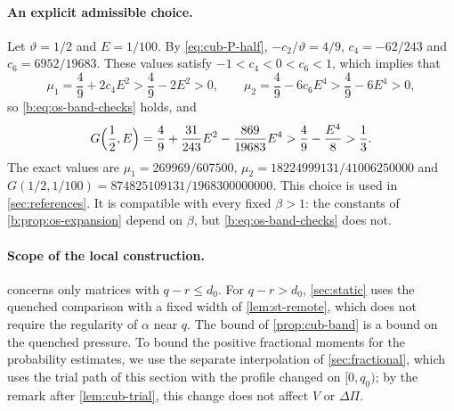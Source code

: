 \paragraph{An explicit admissible choice.} Let $\vartheta=1/2$ and $E=1/100$.
By \eqref{eq:cub-P-half}, $-c_2/\vartheta=4/9$,
$c_4=-62/243$ and $c_6=6952/19683$. These values satisfy $-1<c_4<0<c_6<1$,
which implies that
\[
 \mu_1=\frac49+2c_4E^2>\frac49-2E^2>0,\qquad
 \mu_2=\frac49-6c_6E^4>\frac49-6E^4>0,
\]
so \eqref{b:eq:os-band-checks} holds, and
\[
 G\Bigl(\frac12,E\Bigr)=\frac49+\frac{31}{243}E^2-\frac{869}{19683}E^4
 >\frac49-\frac{E^4}8>\frac13.
\]
The exact values are $\mu_1=269969/607500$, $\mu_2=18224999131/41006250000$ and
$G(1/2,1/100)=874825109131/1968300000000$. This choice is used in
\cref{sec:references}. It is compatible with every fixed $\beta>1$: the
constants of \cref{b:prop:os-expansion} depend on $\beta$, but
\eqref{b:eq:os-band-checks} does not.

\paragraph{Scope of the local construction.}  concerns only
matrices with $q-r\le d_0$. For $q-r>d_0$, \cref{sec:static} uses the quenched
comparison with a fixed width of \cref{lem:st-remote}, which does not require
the regularity of $\alpha$ near $q$. The bound of \cref{prop:cub-band} is a
bound on the quenched pressure. To bound the positive fractional moments for the
probability estimates, we use the separate interpolation of
\cref{sec:fractional}, which uses the trial path of this section with the
profile changed on $[0,q_0)$; by the remark after \cref{lem:cub-trial}, this
change does not affect $V$ or $\Delta\Pi$.

